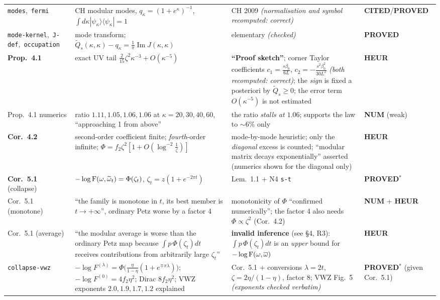 \documentclass[11pt]{article}
\newcommand{\stPR}{{\color{okgreen}\textsf{\scriptsize\bfseries PROVED}}}
\newcommand{\stPMC}{{\color{teal}\textsf{\scriptsize\bfseries PROVED$^\ast$}}}
\newcommand{\stCIT}{{\color{navy}\textsf{\scriptsize\bfseries CITED}}}
\newcommand{\stNUM}{{\color{orange!80!black}\textsf{\scriptsize\bfseries NUM}}}
\newcommand{\stHEU}{{\color{warn}\textsf{\scriptsize\bfseries HEUR}}}
\newcommand{\NIV}{N4}\newcommand{\NV}{N5}\newcommand{\NVI}{N6}\newcommand{\NVII}{N7}
\newcommand{\zz}{\zeta}
\begin{document}
{\begin{tabularx}{\textwidth}{L{0.155\textwidth} X L{0.210\textwidth} L{0.098\textwidth}}
\texttt{modes},\allowbreak\ \texttt{fermi} & CH modular modes, $q_\kappa=(1+e^\kappa)^{-1}$, $\int d\kappa|\psi_\kappa\rangle\langle\psi_\kappa|=1$ & CH 2009 \emph{(normalisation and symbol recomputed: correct)} & \stCIT{}/\stPR \\
\texttt{mode-kernel},\allowbreak\ \texttt{J-def},\allowbreak\ \texttt{occupation} & mode transform; $\widetilde Q_s(\kappa,\kappa)-q_\kappa=\frac1\pi\operatorname{Im}J(\kappa,\kappa)$ & elementary \emph{(checked)} & \stPR \\
\textbf{Prop.~4.1} & exact UV tail $\frac2{15}\zz^2\kappa^{-3}+O(\kappa^{-5})$ & \textbf{``Proof sketch''}; corner Taylor coefficients $c_1=\frac{s\beta_0}{6L}$, $c_2=-\frac{s^2\beta_0^2}{30L^2}$ \emph{(both recomputed: correct)}; the \emph{sign} is fixed a posteriori by $\widetilde Q_s\ge0$; the error term $O(\kappa^{-5})$ is not estimated & \stHEU \\
Prop.~4.1 numerics & ratio $1.11,1.05,1.06,1.06$ at $\kappa=20,30,40,60$, ``approaching 1 from above'' & the ratio \emph{stalls at $1.06$}; supports the law to $\sim6\%$ only & \stNUM{} (weak) \\
\textbf{Cor.~4.2} & second-order coefficient finite; \emph{fourth}-order infinite; $\Phi=f_2\zz^2[1+O(\log^{-2}\frac1\zz)]$ & mode-by-mode heuristic; only the \emph{diagonal} excess is counted; ``modular matrix decays exponentially'' asserted (numerics shown for the diagonal only) & \stHEU \\
\textbf{Cor.~5.1} (collapse) & $-\log\Fid(\omega,\widetilde\omega_t)=\Phi(\zz_t)$, $\zz_t=z(1+e^{-2\pi t})$ & Lem.~1.1 + \NIV{} \texttt{s-t} & \stPMC \\
Cor.~5.1 (monotone) & ``the family is monotone in $t$, its best member is $t\to+\infty$'', ordinary Petz worse by a factor 4 & monotonicity of $\Phi$ ``confirmed numerically''; the factor 4 also needs $\Phi\propto\zz^2$ (Cor.~4.2) & \stNUM{} + \stHEU \\
Cor.~5.1 (average) & ``the modular average is worse than the ordinary Petz map because $\int p\,\Phi(\zz_t)dt$ receives contributions from arbitrarily large $\zz_t$'' & \textbf{invalid inference} (see \S4, R3): $\int p\,\Phi(\zz_t)dt$ is an \emph{upper} bound for $-\log\operatorname{F}(\omega,\overline\omega)$ & \stHEU \\
\texttt{collapse-vwz} & $-\log F^{(\lambda)}=\Phi\bigl(\tfrac\eta{1-\eta}(1{+}e^{\mp\pi\lambda})\bigr)$; $-\log F^{(0)}=4f_2\eta^2$; Dirac $8f_2\eta^2$; VWZ exponents $2.0,1.9,1.7,1.2$ explained & Cor.~5.1 + conversions $\lambda=2t$, $\zz=2\eta/(1{-}\eta)$, factor 8; VWZ Fig.~5 \emph{(exponents checked verbatim)} & \stPMC{} (given Cor.~5.1) \\

\end{tabularx}}
\end{document}
